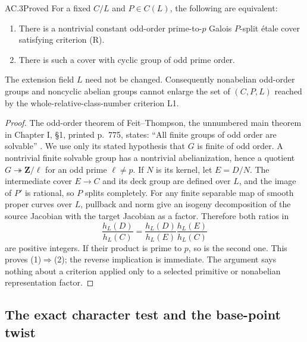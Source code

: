 \begin{claim}{AC.3}{Proved}
For a fixed $C/L$ and $P\in C(L)$, the following are equivalent:
\begin{enumerate}
\item There is a nontrivial constant odd-order prime-to-$p$ Galois
$P$-split \'etale cover satisfying criterion (R).
\item There is such a cover with cyclic group of odd prime order.
\end{enumerate}
The extension field $L$ need not be changed.  Consequently nonabelian
odd-order groups and noncyclic abelian groups cannot enlarge the set of
$(C,P,L)$ reached by the whole-relative-class-number criterion L1.
\end{claim}
\begin{proof}
The odd-order theorem of Feit--Thompson, the unnumbered main theorem in
Chapter I, \S1, printed p.~775, states: ``All finite groups of odd order are
solvable'' \cite{AC_FeitThompson1963}.  We use only its stated hypothesis
that $G$ is finite of odd order.  A nontrivial finite solvable group has a
nontrivial abelianization, hence a quotient $G\twoheadrightarrow
\mathbf Z/\ell$ for an odd prime $\ell\ne p$.  If $N$ is its kernel, let
$E=D/N$.  The intermediate cover $E\to C$ and its deck group are defined
over $L$, and the image of $P'$ is rational, so $P$ splits completely.
For any finite separable map of smooth proper curves over $L$, pullback and
norm give an isogeny decomposition of the source Jacobian with the target
Jacobian as a factor.  Therefore both ratios in
\[
        \frac{h_L(D)}{h_L(C)}=
        \frac{h_L(D)}{h_L(E)}\frac{h_L(E)}{h_L(C)}
\]
are positive integers.  If their product is prime to $p$, so is the second
one.  This proves (1)$\Rightarrow$(2); the reverse implication is immediate.
The argument says nothing about a criterion applied only to a selected
primitive or nonabelian representation factor.
\end{proof}

\subsection{The exact character test and the base-point twist}

